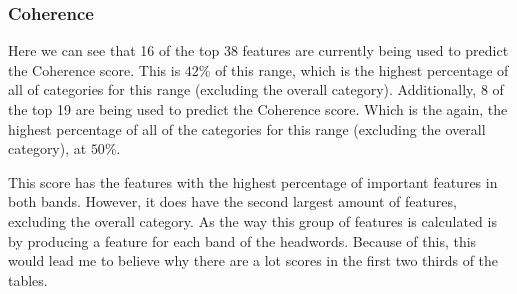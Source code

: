 \subsubsection{Coherence}

Here we can see that 16 of the top 38 features are currently being used to predict the Coherence score. This is $42\%$ of this range, which is the highest percentage of all of categories for this range (excluding the overall category). Additionally, 8 of the top 19 are being used to predict the Coherence score. Which is the again, the highest percentage of all of the categories for this range (excluding the overall category), at $50\%$. 

This score has the features with the highest percentage of important features in both bands. However, it does have the second largest amount of features, excluding the overall category. As the way this group of features is calculated is by producing a feature for each band of the headwords. Because of this, this would lead me to believe why there are a lot scores in the first two thirds of the tables.

